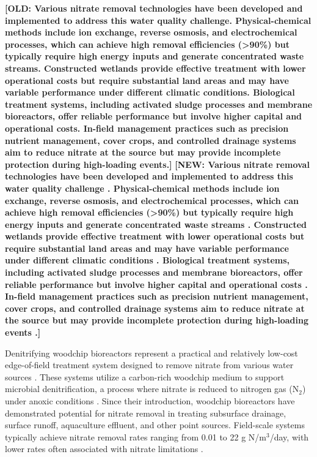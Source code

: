 \documentclass[12pt,a4paper]{article}
\newcommand{\replaced}[2]{\textcolor{deletedtext}{\textbf{[OLD: #1]}} \textcolor{replacedtext}{\textbf{[NEW: #2]}}}
\begin{document}
\replaced{Various nitrate removal technologies have been developed and implemented to address this water quality challenge. Physical-chemical methods include ion exchange, reverse osmosis, and electrochemical processes, which can achieve high removal efficiencies (>90\%) but typically require high energy inputs and generate concentrated waste streams. Constructed wetlands provide effective treatment with lower operational costs but require substantial land areas and may have variable performance under different climatic conditions. Biological treatment systems, including activated sludge processes and membrane bioreactors, offer reliable performance but involve higher capital and operational costs. In-field management practices such as precision nutrient management, cover crops, and controlled drainage systems aim to reduce nitrate at the source but may provide incomplete protection during high-loading events.}{Various nitrate removal technologies have been developed and implemented to address this water quality challenge \citep{RN625, RN826}. Physical-chemical methods include ion exchange, reverse osmosis, and electrochemical processes, which can achieve high removal efficiencies (>90\%) but typically require high energy inputs and generate concentrated waste streams \citep{RN625}. Constructed wetlands provide effective treatment with lower operational costs but require substantial land areas and may have variable performance under different climatic conditions \citep{RN826}. Biological treatment systems, including activated sludge processes and membrane bioreactors, offer reliable performance but involve higher capital and operational costs \citep{RN625}. In-field management practices such as precision nutrient management, cover crops, and controlled drainage systems aim to reduce nitrate at the source but may provide incomplete protection during high-loading events \citep{RN826}.}

Denitrifying woodchip bioreactors represent a practical and relatively low-cost edge-of-field treatment system designed to remove nitrate from various water sources \citep{RN625, RN310}. These systems utilize a carbon-rich woodchip medium to support microbial denitrification, a process where nitrate is reduced to nitrogen gas (N$_{2}$) under anoxic conditions \citep{RN242, RN629}. Since their introduction, woodchip bioreactors have demonstrated potential for nitrate removal in treating subsurface drainage, surface runoff, aquaculture effluent, and other point sources. Field-scale systems typically achieve nitrate removal rates ranging from 0.01 to 22 g N/m$^3$/day, with lower rates often associated with nitrate limitations \citep{RN625, RN310}.
\end{document}
